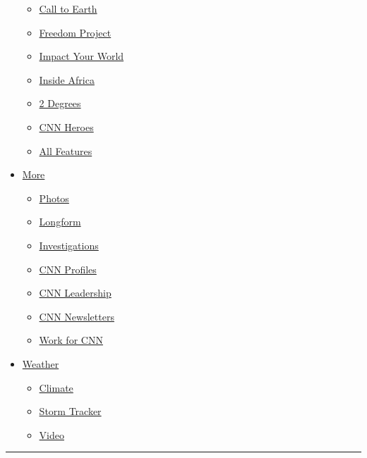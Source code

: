\begin{itemize}
  \begin{itemize}
  \tightlist
  \item
    \href{/interactive/call-to-earth}{Call to Earth}
  \item
    \href{/specials/world/freedom-project}{Freedom Project}
  \item
    \href{/specials/impact-your-world}{Impact Your World}
  \item
    \href{/specials/africa/inside-africa}{Inside Africa}
  \item
    \href{/specials/opinions/two-degrees}{2 Degrees}
  \item
    \href{/specials/cnn-heroes}{CNN Heroes}
  \item
    \href{/specials}{All Features}
  \end{itemize}
\item
  \href{/more}{More}

  \begin{itemize}
  \tightlist
  \item
    \href{/specials/photos}{Photos}
  \item
    \href{/specials/cnn-longform}{Longform}
  \item
    \href{/specials/cnn-investigates}{Investigations}
  \item
    \href{/specials/profiles}{CNN Profiles}
  \item
    \href{/specials/more/cnn-leadership}{CNN Leadership}
  \item
    \href{/email/subscription}{CNN Newsletters}
  \item
    \href{https://www.turnerjobs.com/search-jobs?orgIds=1174\&ac=19299}{Work
    for CNN}
  \end{itemize}
\item
  \href{/weather}{Weather}

  \begin{itemize}
  \tightlist
  \item
    \href{/specials/world/cnn-climate}{Climate}
  \item
    \href{/interactive/2020/weather/gonzalo-storm-path-tracker/index.html}{Storm
    Tracker}
  \item
    \href{/specials/weather/weather-video}{Video}
  \end{itemize}
\end{itemize}

\begin{center}\rule{0.5\linewidth}{\linethickness}\end{center}

